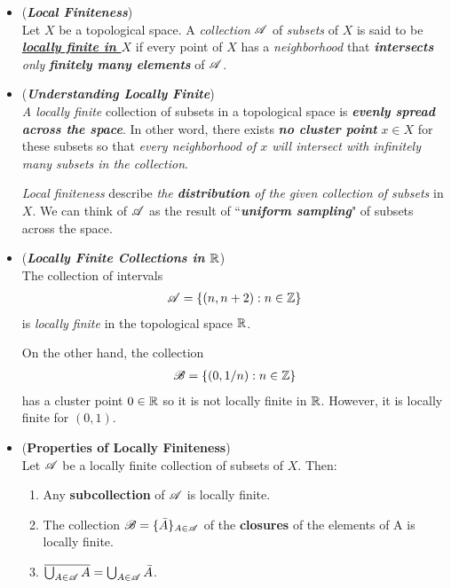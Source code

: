 \documentclass[11pt]{article}
\begin{document}
\begin{itemize}
\item \begin{definition} (\emph{\textbf{Local Finiteness}})\\
Let $X$ be a topological space. A \emph{collection} ${\mathscr A}$ of \emph{subsets} of $X$ is said to be \underline{\emph{\textbf{locally finite in $X$}}} if every point of $X$ has a \emph{neighborhood} that \emph{\textbf{intersects} only \textbf{finitely many elements}} of ${\mathscr A}$.
\end{definition}

\item \begin{remark} (\emph{\textbf{Understanding Locally Finite}})\\
\emph{A locally finite} collection of subsets in a topological space is \emph{\textbf{evenly spread across the space}}. In other word, there exists \emph{\textbf{no cluster point}} $x \in X$ for these subsets so that \emph{every neighborhood of $x$ will intersect with infinitely many subsets in the collection}.

\emph{Local finiteness} describe \emph{the \textbf{distribution} of the given collection of subsets} in $X$. We can think of ${\mathscr A}$ as the result of ``\emph{\textbf{uniform sampling}}" of subsets across the space.
\end{remark}

\item \begin{example} (\emph{\textbf{Locally Finite Collections in ${\mathbb R}$}})\\
The collection of intervals
\begin{align*}
{\mathscr A} = \{(n, n + 2): n \in {\mathbb Z}\}
\end{align*}
is \emph{locally finite} in the topological space ${\mathbb R}$.

On the other hand, the collection
\begin{align*}
{\mathscr B} = \{(0, 1/n): n \in {\mathbb Z}\}
\end{align*} has a cluster point $0\in {\mathbb R}$ so it is not locally finite in ${\mathbb R}$. However, it is locally finite for $(0, 1)$.
\end{example}

\item \begin{lemma} (\textbf{Properties of Locally Finiteness}) \citep{munkres2000topology}\\
Let ${\mathscr A}$ be a locally finite collection of subsets of $X$. Then:
\begin{enumerate}
\item Any \textbf{subcollection} of ${\mathscr A}$ is locally finite.
\item The collection ${\mathscr B} = \{\bar{A}\}_{A \in {\mathscr A}}$ of the \textbf{closures} of the elements of A is locally finite.
\item $\overline{\bigcup_{A \in {\mathscr A}}A} = \bigcup_{A \in {\mathscr A}}\bar{A}$.
\end{enumerate}
\end{lemma}


\end{itemize}
\end{document}
